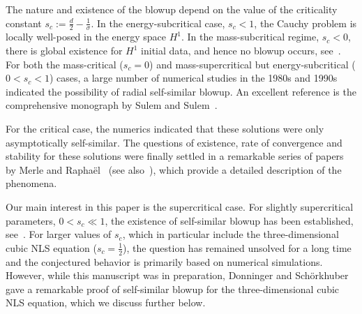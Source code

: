 \documentclass[11pt]{article}
\begin{document}
The nature and existence of the blowup depend on the value of the
criticality constant \(s_{c} := \frac{d}{2} - \frac{1}{\sigma}\). In
the energy-subcritical case, \(s_{c} < 1\), the Cauchy problem is
locally well-posed in the energy space \(H^{1}\). In the
mass-subcritical regime, \(s_{c} < 0\), there is global existence for
\(H^{1}\) initial data, and hence no blowup occurs,
see~\cite{Cazenave88, Cazenave2003}. For both the mass-critical
(\(s_{c} = 0\)) and mass-supercritical but energy-subcritical
(\(0 < s_{c} < 1\)) cases, a large number of numerical studies in the
1980s and 1990s indicated the possibility of radial self-similar
blowup. An excellent reference is the comprehensive monograph by Sulem
and Sulem~\cite{Sulem1999}.

For the critical case, the numerics indicated that these solutions
were only asymptotically self-similar. The questions of existence,
rate of convergence and stability for these solutions were finally
settled in a remarkable series of papers by Merle and
Raphaël~\cite{Merle2005a, Merle2004a, Merle2006, Merle2004b} (see
also~\cite{Perelman2001}), which provide a detailed description of the
phenomena.

Our main interest in this paper is the supercritical case. For
slightly supercritical parameters, \(0 < s_{c} \ll 1\), the existence
of self-similar blowup has been established,
see~\cite{Rottschafer2002, Rottschafer2003, Merle2010, Merle2014,
  Bahri2021}. For larger values of \(s_{c}\), which in particular
include the three-dimensional cubic NLS equation
(\(s_{c} = \frac{1}{2}\)), the question has remained unsolved for a
long time and the conjectured behavior is primarily based on numerical
simulations. However, while this manuscript was in preparation,
Donninger and Schörkhuber~\cite{Donninger2024} gave a remarkable proof
of self-similar blowup for the three-dimensional cubic NLS equation,
which we discuss further below.
\end{document}
